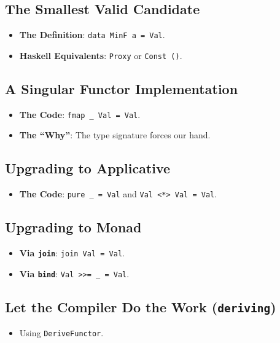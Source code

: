 \documentclass[12pt,a4paper]{article}
\begin{document}
\subsection{The Smallest Valid Candidate}
\begin{itemize}
    \item \textbf{The Definition}: \texttt{data MinF a = Val}.
    \item \textbf{Haskell Equivalents}: \texttt{Proxy} or \texttt{Const ()}.
\end{itemize}

\subsection{A Singular Functor Implementation}
\begin{itemize}
    \item \textbf{The Code}: \texttt{fmap \_ Val = Val}.
    \item \textbf{The ``Why''}: The type signature forces our hand.
\end{itemize}

\subsection{Upgrading to Applicative}
\begin{itemize}
    \item \textbf{The Code}: \texttt{pure \_ = Val} and \texttt{Val <*> Val = Val}.
\end{itemize}

\subsection{Upgrading to Monad}
\begin{itemize}
    \item \textbf{Via \texttt{join}}: \texttt{join Val = Val}.
    \item \textbf{Via \texttt{bind}}: \texttt{Val >>= \_ = Val}.
\end{itemize}

\subsection{Let the Compiler Do the Work (\texttt{deriving})}
\begin{itemize}
    \item Using \texttt{DeriveFunctor}.
\end{itemize}
\end{document}
